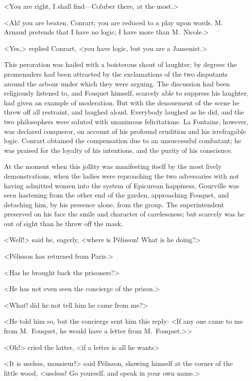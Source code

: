 <You are right, I shall find—Coluber there, at the most.>

<Ah! you are beaten, Conrart; you are reduced to a play upon words. M.~ Arnaud pretends that I have no logic; I have more than M.~Nicole.>

<Yes,> replied Conrart, <you have logic, but you are a Jansenist.>

This peroration was hailed with a boisterous shout of laughter; by degrees the promenaders had been attracted by the exclamations of the two disputants around the arbour under which they were arguing. The discussion had been religiously listened to, and Fouquet himself, scarcely able to suppress his laughter, had given an example of moderation. But with the denouement of the scene he threw off all restraint, and laughed aloud. Everybody laughed as he did, and the two philosophers were saluted with unanimous felicitations. La Fontaine, however, was declared conqueror, on account of his profound erudition and his irrefragable logic. Conrart obtained the compensation due to an unsuccessful combatant; he was praised for the loyalty of his intentions, and the purity of his conscience.

At the moment when this jollity was manifesting itself by the most lively demonstrations, when the ladies were reproaching the two adversaries with not having admitted women into the system of Epicurean happiness, Gourville was seen hastening from the other end of the garden, approaching Fouquet, and detaching him, by his presence alone, from the group. The superintendent preserved on his face the smile and character of carelessness; but scarcely was he out of sight than he threw off the mask.

<Well!> said he, eagerly, <where is Pélisson! What is he doing?>

<Pélisson has returned from Paris.>

<Has he brought back the prisoners?>

<He has not even seen the concierge of the prison.>

<What! did he not tell him he came from me?>

<He told him so, but the concierge sent him this reply: <If any one came to me from M.~Fouquet, he would have a letter from M.~Fouquet.>>

<Oh!> cried the latter, <if a letter is all he wants\longdash>

<It is useless, monsieur!> said Pélisson, showing himself at the corner of the little wood, <useless! Go yourself, and speak in your own name.>


